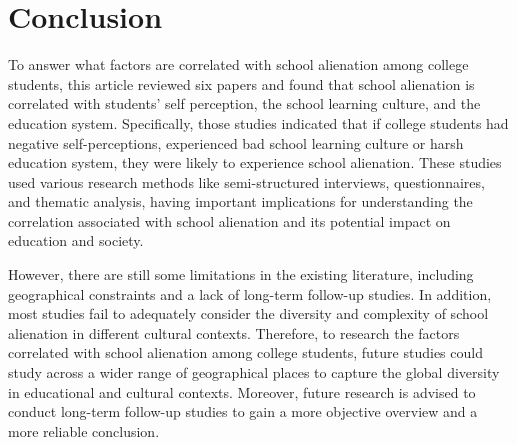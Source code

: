 \documentclass{scupi_apa_thesis}
\begin{document}
\section{Conclusion}
\par
To answer what factors are correlated with school alienation among college students, this article reviewed six papers and found that school alienation is correlated with students' self perception, the school learning culture, and the education system. 
Specifically, those studies indicated that if college students had negative self-perceptions, experienced bad school learning culture or harsh education system, they were likely to experience school alienation. 
These studies used various research methods like semi-structured interviews, questionnaires, and thematic analysis, having important implications for understanding the correlation associated with school alienation and its potential impact on education and society.
\par
However, there are still some limitations in the existing literature, including geographical constraints and a lack of long-term follow-up studies. 
In addition, most studies fail to adequately consider the diversity and complexity of school alienation in different cultural contexts. 
Therefore, to research the factors correlated with school alienation among college students, future studies could study across a wider range of geographical places to capture the global diversity in educational and cultural contexts. 
Moreover, future research is advised to conduct long-term follow-up studies to gain a more objective overview and a more reliable conclusion.


\newpage



\end{document}
